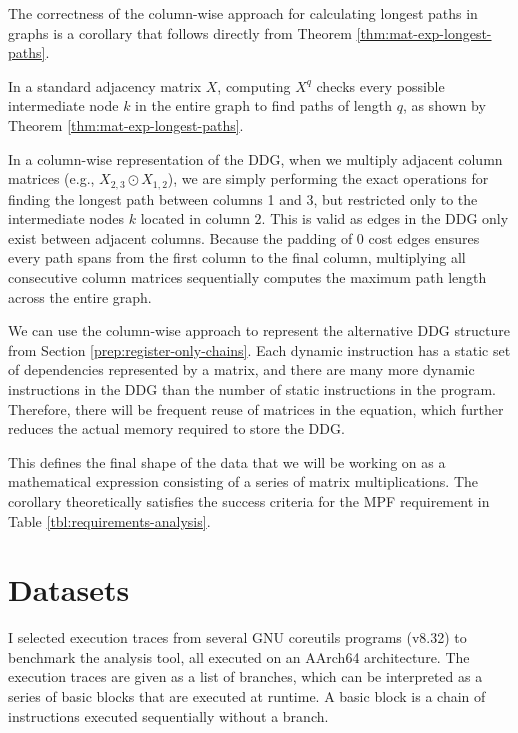The correctness of the column-wise approach for calculating longest paths in graphs is a corollary that follows directly 
from Theorem \ref{thm:mat-exp-longest-paths}.

\begin{corollary}
  In a standard adjacency matrix $X$, computing $X^{q}$ checks every possible intermediate node 
  $k$ in the entire graph to find paths of length $q$, as shown by Theorem \ref{thm:mat-exp-longest-paths}.

  In a column-wise representation of the DDG, when we multiply adjacent column matrices (e.g., $X_{2,3} \odot X_{1,2}$),
  we are simply performing the exact operations for finding the longest path between columns 1 and 3,
  but restricted only to the intermediate nodes $k$ located in column $2$.
  This is valid as edges in the DDG only exist between adjacent columns.
  Because the padding of 0 cost edges ensures every path spans from the first column to the final column, multiplying 
  all consecutive column matrices sequentially computes the maximum path length across the entire graph.
\end{corollary}

We can use the column-wise approach to represent the alternative DDG structure from Section \ref{prep:register-only-chains}.
Each dynamic instruction has a static set of dependencies represented by a matrix, and there are many 
more dynamic instructions in the DDG than the number of static instructions in the program. Therefore, there will be
frequent reuse of matrices in the equation, which further reduces the actual memory required to store the DDG.

This defines the final shape of the data that we will be working on as a mathematical expression consisting of a
series of matrix multiplications. The corollary theoretically satisfies the success criteria for the MPF requirement 
in Table \ref{tbl:requirements-analysis}.

\section{Datasets} \label{prep:datasets}

I selected execution traces from several GNU coreutils programs (v8.32) \cite{coreutils} to benchmark the analysis tool,
all executed on an AArch64 architecture. The execution traces are given as a list of branches,
which can be interpreted as a series of basic blocks that are executed at runtime. A basic block is a chain of instructions
executed sequentially without a branch.


